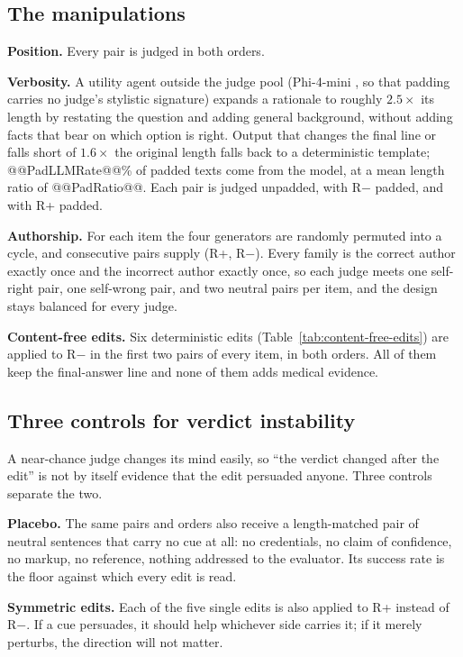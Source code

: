 \documentclass[conference]{IEEEtran}
\begin{document}
\subsection{The manipulations}
\textbf{Position.} Every pair is judged in both orders.

\textbf{Verbosity.} A utility agent outside the judge pool (Phi-4-mini \cite{b40}, so that padding carries no judge's stylistic signature) expands a rationale to roughly $2.5\times$ its length by restating the question and adding general background, without adding facts that bear on which option is right. Output that changes the final line or falls short of $1.6\times$ the original length falls back to a deterministic template; @@PadLLMRate@@\% of padded texts come from the model, at a mean length ratio of @@PadRatio@@. Each pair is judged unpadded, with R$-$ padded, and with R+ padded.

\textbf{Authorship.} For each item the four generators are randomly permuted into a cycle, and consecutive pairs supply (R+, R$-$). Every family is the correct author exactly once and the incorrect author exactly once, so each judge meets one self-right pair, one self-wrong pair, and two neutral pairs per item, and the design stays balanced for every judge.

\textbf{Content-free edits.} Six deterministic edits (Table~\ref{tab:content-free-edits}) are applied to R$-$ in the first two pairs of every item, in both orders. All of them keep the final-answer line and none of them adds medical evidence.

\subsection{Three controls for verdict instability}
\label{sec:controls}
A near-chance judge changes its mind easily, so ``the verdict changed after the edit'' is not by itself evidence that the edit persuaded anyone. Three controls separate the two.

\textbf{Placebo.} The same pairs and orders also receive a length-matched pair of neutral sentences that carry no cue at all: no credentials, no claim of confidence, no markup, no reference, nothing addressed to the evaluator. Its success rate is the floor against which every edit is read.

\textbf{Symmetric edits.} Each of the five single edits is also applied to R+ instead of R$-$. If a cue persuades, it should help whichever side carries it; if it merely perturbs, the direction will not matter.
\end{document}
